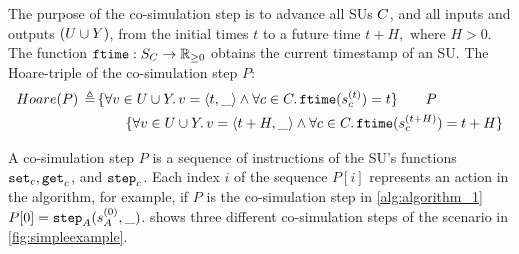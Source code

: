 The purpose of the co-simulation step is to advance all SUs $C$, and all inputs and outputs $(U \cup Y)$, from the initial times $t$ to a future time $t+H, \textrm{ where } H > 0$. 
The function $\mathtt{ftime}: S_{C} \to \mathbb{R}_{\geq 0}$ obtains the current timestamp of an SU.
The Hoare-triple of the co-simulation step $P$:
\begin{align*}
  Hoare(P) \,\triangleq\, &\{\forall v \in U \cup Y \ldotp v =  \left\langle t, \_ \right\rangle  \land \forall c \in C \ldotp \mathtt{ftime}(s_{c}^{(t)}) = t\} \qquad  P \\
  & \qquad \{\forall v \in U \cup Y \ldotp v =  \left\langle t+H, \_ \right\rangle  \land \forall c \in C \ldotp \mathtt{ftime}(s_{c}^{(t+H)}) = t+H \}
\end{align*}

A co-simulation step $P$ is a sequence of instructions of the SU's functions $\mathtt{set}_{c},\mathtt{get}_{c}$, and $\mathtt{step}_{c}$. 
Each index $i$ of the sequence $P[i]$ represents an action in the algorithm, for example, if $P$ is the co-simulation step in \cref{alg:algorithm_1} $P[0] = \mathtt{step}_{A}(s_{A}^{(0)}, \_)$.  shows three different co-simulation steps of the scenario in \cref{fig:simpleexample}. 

